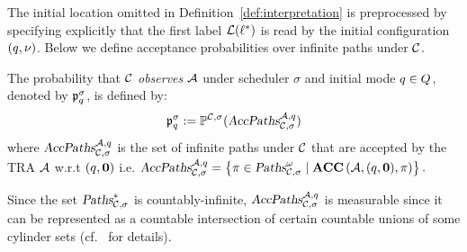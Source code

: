 The initial location omitted in Definition~\ref{def:interpretation} is preprocessed by specifying explicitly that the first label $\mathcal{L}(\ell^*)$ is read by the initial configuration $(q,\nu)$.
Below we define acceptance probabilities over infinite paths under $\mathcal{C}$.
\vspace{-0.3em}
\begin{definition}
The probability that $\mathcal{C}$ \emph{observes} $\mathcal{A}$ under scheduler $\sigma$ and initial mode $q\in Q$, denoted by $\mathfrak{p}_{q}^{\sigma}$, is defined by:
\[
    \mathfrak{p}_{q}^{\sigma}
        :=
            \mathbb{P}^{\mathcal{C},\sigma}(
                \mbox{\sl AccPaths} _{\mathcal{C},\sigma} ^{\mathcal{A},q}
            )
\]
where $\mbox{\sl AccPaths} _{\mathcal{C},\sigma} ^{\mathcal{A},q}$ is the set of infinite paths under $\mathcal{C}$ that are accepted by the TRA $\mathcal{A}$ w.r.t $(q,\mathbf{0})$ i.e.
$
    \mbox{\sl AccPaths} _{\mathcal{C},\sigma} ^{\mathcal{A},q} = \left \{
        \pi \in \mbox{\sl Paths}^\omega_{\mathcal{C},\sigma} \mid
        \mbox{\bf ACC} \left( {\mathcal{A}}, {(q,\mathbf{0})}, {\pi} \right)
    \right\}.
$
\end{definition}
Since the set $\mbox{\sl Paths}^*_{\mathcal{C},\sigma}$ is countably-infinite,
$\mbox{\sl AccPaths} _{\mathcal{C},\sigma} ^{\mathcal{A},q}$ is measurable since it can be represented as a countable intersection of certain countable unions of some cylinder sets (cf.~\cite[Remark 10.24]{DBLP:books/daglib/0020348} for details).
